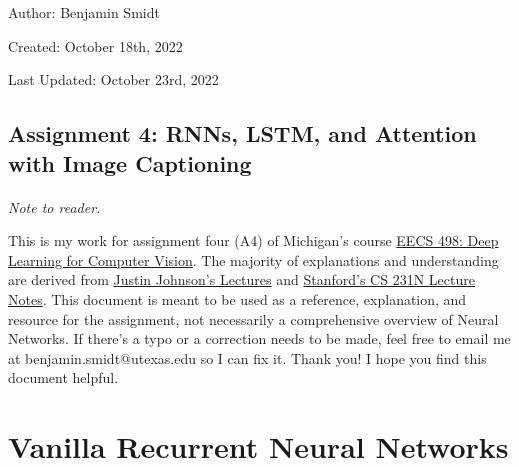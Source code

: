 \documentclass[12pt]{article}
\begin{document}
\noindent Author: Benjamin Smidt

\noindent Created: October 18th, 2022

\noindent Last Updated: October 23rd, 2022
\begin{center}
\section*{Assignment 4: RNNs, LSTM, and Attention with Image Captioning}
\end{center}

\paragraph{} \emph{Note to reader.} 

This is my work for assignment four (A4) of Michigan's course
\href{https://web.eecs.umich.edu/~justincj/teaching/eecs498/WI2022/}
{EECS 498: Deep Learning for Computer Vision}. The majority of explanations and understanding are 
derived from \href{https://www.youtube.com/watch?v=dJYGatp4SvA&list=PL5-TkQAfAZFbzxjBHtzdVCWE0Zbhomg7r&index=1}
{Justin Johnson's Lectures} and \href{http://cs231n.stanford.edu/schedule.html}{Stanford's CS 231N Lecture Notes}.
This document is meant to be used as a reference, 
explanation, and resource for the assignment, not necessarily a comprehensive overview
of Neural Networks. If there's a typo or a correction needs to be made, feel free to 
email me at benjamin.smidt@utexas.edu so I can fix it. Thank you! I hope you find this 
document helpful.

\tableofcontents{}

\newpage

\section{Vanilla Recurrent Neural Networks}
\end{document}
